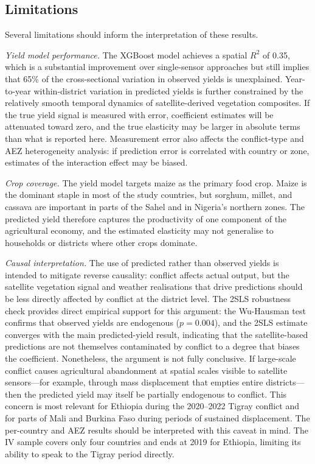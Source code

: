 \subsection{Limitations}

Several limitations should inform the interpretation of these results.

\textit{Yield model performance.} The XGBoost model achieves a spatial $R^2$ of 0.35, which is a substantial improvement over single-sensor approaches but still implies that 65\% of the cross-sectional variation in observed yields is unexplained. Year-to-year within-district variation in predicted yields is further constrained by the relatively smooth temporal dynamics of satellite-derived vegetation composites. If the true yield signal is measured with error, coefficient estimates will be attenuated toward zero, and the true elasticity may be larger in absolute terms than what is reported here. Measurement error also affects the conflict-type and AEZ heterogeneity analysis: if prediction error is correlated with country or zone, estimates of the interaction effect may be biased.

\textit{Crop coverage.} The yield model targets maize as the primary food crop. Maize is the dominant staple in most of the study countries, but sorghum, millet, and cassava are important in parts of the Sahel and in Nigeria's northern zones. The predicted yield therefore captures the productivity of one component of the agricultural economy, and the estimated elasticity may not generalise to households or districts where other crops dominate.

\textit{Causal interpretation.} The use of predicted rather than observed yields is intended to mitigate reverse causality: conflict affects actual output, but the satellite vegetation signal and weather realisations that drive predictions should be less directly affected by conflict at the district level. The 2SLS robustness check provides direct empirical support for this argument: the Wu-Hausman test confirms that observed yields are endogenous ($p = 0.004$), and the 2SLS estimate converges with the main predicted-yield result, indicating that the satellite-based predictions are not themselves contaminated by conflict to a degree that biases the coefficient. Nonetheless, the argument is not fully conclusive. If large-scale conflict causes agricultural abandonment at spatial scales visible to satellite sensors---for example, through mass displacement that empties entire districts---then the predicted yield may itself be partially endogenous to conflict. This concern is most relevant for Ethiopia during the 2020--2022 Tigray conflict and for parts of Mali and Burkina Faso during periods of sustained displacement. The per-country and AEZ results should be interpreted with this caveat in mind. The IV sample covers only four countries and ends at 2019 for Ethiopia, limiting its ability to speak to the Tigray period directly.

